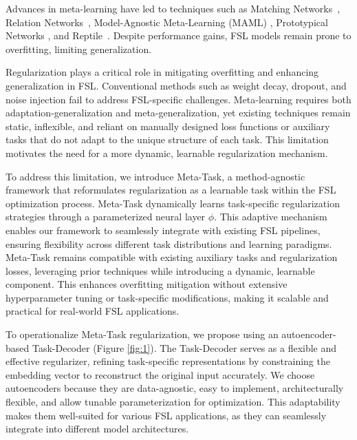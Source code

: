 Advances in meta-learning have led to techniques such as Matching Networks~\cite{NIPS2016_90e13578}, Relation Networks~\cite{sung2018learning}, Model-Agnostic Meta-Learning (MAML) \cite{maml}, Prototypical Networks \cite{snell2017prototypical}, and Reptile~\cite{nichol2018reptile}. Despite performance gains, FSL models remain prone to overfitting, limiting generalization.

Regularization plays a critical role in mitigating overfitting and enhancing generalization in FSL. Conventional methods such as weight decay\cite{krogh1991simple}, dropout\cite{hinton2012improving}, and noise injection\cite{achille2018information, tishby2015deep} fail to address FSL-specific challenges. Meta-learning requires both adaptation-generalization and meta-generalization\cite{rajeswaran2019imaml, mrmaml, pan2021meta, wang2023improving, yao2021meta, yao2021improving, rajendran2020meta}, yet existing techniques remain static, inflexible, and reliant on manually designed loss functions or auxiliary tasks that do not adapt to the unique structure of each task. This limitation motivates the need for a more dynamic, learnable regularization mechanism.

To address this limitation, we introduce Meta-Task, a method-agnostic framework that reformulates regularization as a learnable task within the FSL optimization process. Meta-Task dynamically learns task-specific regularization strategies through a parameterized neural layer $\phi$. This adaptive mechanism enables our framework to seamlessly integrate with existing FSL pipelines, ensuring flexibility across different task distributions and learning paradigms. Meta-Task remains compatible with existing auxiliary tasks and regularization losses, leveraging prior techniques while introducing a dynamic, learnable component. This enhances overfitting mitigation without extensive hyperparameter tuning or task-specific modifications, making it scalable and practical for real-world FSL applications.

To operationalize Meta-Task regularization, we propose using an autoencoder-based Task-Decoder (Figure \ref{fig:1}). The Task-Decoder serves as a flexible and effective regularizer, refining task-specific representations by constraining the embedding vector to reconstruct the original input accurately. We choose autoencoders because they are data-agnostic, easy to implement, architecturally flexible, and allow tunable parameterization for optimization. This adaptability makes them well-suited for various FSL applications, as they can seamlessly integrate into different model architectures.

